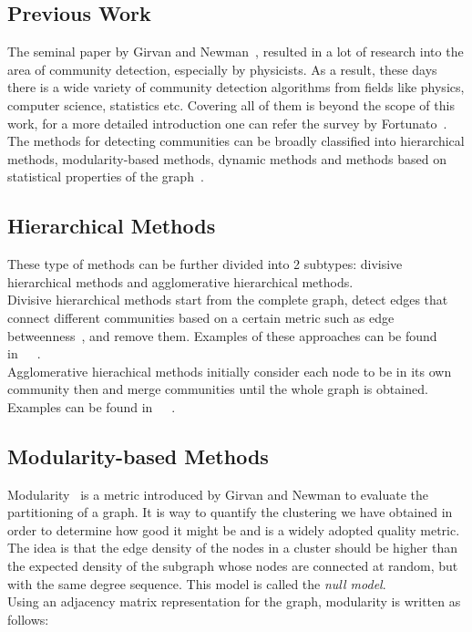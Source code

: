 \begin{spacing}{1.5}
\section{Previous Work}

The seminal paper by Girvan and Newman~\cite{Girvan11062002}, resulted in a lot of research into the area of community detection, especially by physicists. As a result, these days there is a wide variety of community detection algorithms from fields like physics, computer science, statistics etc. Covering all of them is beyond the scope of this work, for a more detailed introduction one can refer the survey by Fortunato~\cite{Fortunato201075}.\\
\indent The methods for detecting communities can be broadly classified into hierarchical methods, modularity-based methods, dynamic methods and methods based on statistical properties of the graph~\cite{Fortunato201075}.

\subsection{Hierarchical Methods}

These type of methods can be further divided into 2 subtypes: divisive hierarchical methods and agglomerative hierarchical methods.\\
\indent Divisive hierarchical methods start from the complete graph, detect edges that connect different communities based on a certain metric such as edge betweenness~\cite{Girvan11062002}, and remove them. Examples of these approaches can be found in~\cite{Girvan11062002}~\cite{Radicchi02032004}~\cite{PhysRevE.69.026113}.\\
\indent Agglomerative hierachical methods initially consider each node to be in its own community then and merge communities until the whole graph is obtained. Examples can be found in~\cite{newman03fast}~\cite{blondel2008fuc}~\cite{Clauset2004}.

\subsection{Modularity-based Methods}

Modularity~\cite{PhysRevE.69.026113} is a metric introduced by Girvan and Newman to evaluate the partitioning of a graph. It is way to quantify the clustering we have obtained in order to determine how good it might be and is a widely adopted quality metric. The idea is that the edge density of the nodes in a cluster should be higher than the expected density of the subgraph whose nodes are connected at random, but with the same degree sequence. This model is called the \emph{null model}. \\
\indent Using an adjacency matrix representation for the graph, modularity is written as follows:


\end{spacing}

